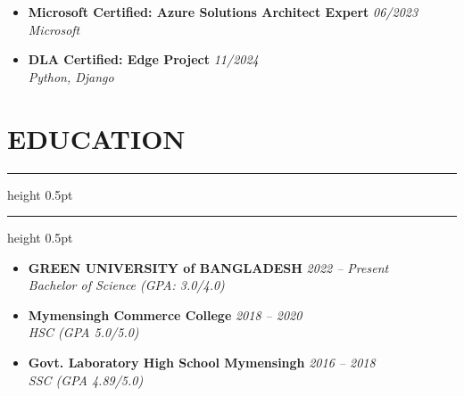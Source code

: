 \documentclass[10pt, a4paper]{scrartcl}
\newcommand{\maintitle}[1]{
    \section*{#1}
    \vspace{-6pt} %
    \hrule height 0.5pt \vspace{2pt}
    \hrule height 0.5pt \vspace{4pt}
}
\newcommand{\education}[3]{%
    \vspace{4pt}
    \begin{itemize}[label=\tiny\textbullet, noitemsep, topsep=2pt, parsep=0pt, leftmargin=1em]
        \item \textbf{#1} \hfill \textit{#3} \\
        \hspace{0.5em} \textit{#2}
    \end{itemize}
}
\begin{document}
\begin{minipage}[t]{0.68\textwidth}
    \education{Microsoft Certified: Azure Solutions Architect Expert}{Microsoft}{06/2023}

    \education{DLA Certified: Edge Project}{Python, Django}{11/2024}


    
    \maintitle{EDUCATION}

    \education{GREEN UNIVERSITY of BANGLADESH}{Bachelor of Science (GPA: 3.0/4.0)}{2022 -- Present}

    \education{Mymensingh Commerce College}{HSC (GPA 5.0/5.0)}{2018 -- 2020}

    \education{Govt. Laboratory High School Mymensingh}{SSC (GPA 4.89/5.0)}{2016 -- 2018}


\end{minipage}
\end{document}
